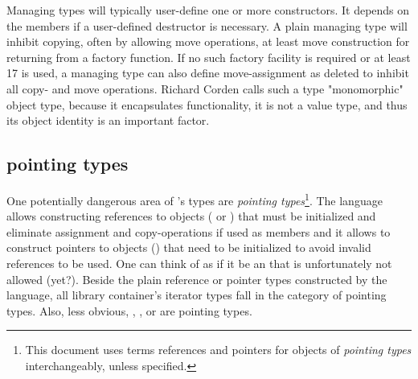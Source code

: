 \documentclass[ebook,11pt,article]{memoir}
\begin{document}
Managing types will typically user-define one or more constructors. It depends on the members if a user-defined destructor is necessary. A plain managing type will inhibit copying, often by allowing move operations, at least move construction for returning from a factory function. If no such factory facility is required or at least \Cpp{}17 is used, a managing type can also define move-assignment as deleted to inhibit all copy- and move operations. Richard Corden calls such a type "monomorphic" object type, because it encapsulates functionality, it is not a value type, and thus its object identity is an important factor.

\subsection{pointing types}

One potentially dangerous area of \Cpp{}'s types are \emph{pointing types}\footnote{This document uses terms references and pointers for objects of \emph{pointing types} interchangeably, unless specified.}. The language allows constructing references to objects ( or ) that must be initialized and eliminate assignment and copy-operations if used as members and it allows to construct pointers to objects () that need to be initialized to avoid invalid references to be used. One can think of  as if it be an  that is unfortunately not allowed (yet?). Beside the plain reference or pointer types constructed by the language, all library container's iterator types fall in the category of pointing types. Also, less obvious, , , or  are pointing types.
\end{document}
